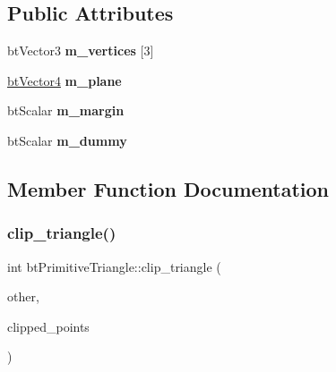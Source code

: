 \subsection*{Public Attributes}
\begin{DoxyCompactItemize}
\item 
\mbox{\label{classbtPrimitiveTriangle_aa66f69b06b8696485dade81eba843d61}} 
bt\+Vector3 {\bfseries m\+\_\+vertices} \mbox{[}3\mbox{]}
\item 
\mbox{\label{classbtPrimitiveTriangle_acee3713806388dc0cbcffd2cd72e6947}} 
\hyperlink{classbtVector4}{bt\+Vector4} {\bfseries m\+\_\+plane}
\item 
\mbox{\label{classbtPrimitiveTriangle_a7650fff79447f8adcaa30a06c3caef39}} 
bt\+Scalar {\bfseries m\+\_\+margin}
\item 
\mbox{\label{classbtPrimitiveTriangle_a54a0a58a99e14a99747a4d2d1a248fab}} 
bt\+Scalar {\bfseries m\+\_\+dummy}
\end{DoxyCompactItemize}


\subsection{Member Function Documentation}
\mbox{\label{classbtPrimitiveTriangle_a56e930410f18f866e47431ed77c6c3ca}} 
\subsubsection{\texorpdfstring{clip\+\_\+triangle()}{clip\_triangle()}\hspace{0.1cm}{\footnotesize\ttfamily [1/2]}}
{\footnotesize\ttfamily int bt\+Primitive\+Triangle\+::clip\+\_\+triangle (\begin{DoxyParamCaption}\item[{\hyperlink{classbtPrimitiveTriangle}{bt\+Primitive\+Triangle} \&}]{other,  }\item[{bt\+Vector3 $\ast$}]{clipped\+\_\+points }\end{DoxyParamCaption})}



